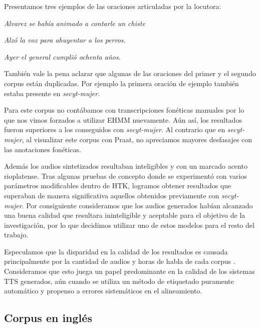 Presentamos tres ejemplos de las oraciones articuladas por la locutora:

\indent\indent \textit{Alvarez se había animado a contarle un chiste}

\indent\indent \textit{Alzó la voz para ahuyentar a los perros.}

\indent\indent \textit{Ayer el general cumplió ochenta años.}

También vale la pena aclarar que algunas de las oraciones del primer y el segundo corpus están duplicadas. Por ejemplo la primera oración de ejemplo también estaba presente en \textit{secyt-mujer}.

Para este corpus no contábamos con transcripciones fonéticas manuales por lo que nos vimos forzados a utilizar EHMM nuevamente. Aún así, los resultados fueron superiores a los conseguidos con \textit{secyt-mujer}. Al contrario que en \textit{secyt-mujer}, al visualizar este corpus con Praat, no apreciamos mayores desfasajes con las anotaciones fonéticas.

Además los audios sintetizados resultaban inteligibles y con un marcado acento rioplatense. Tras algunas pruebas de concepto donde se experimentó con varios parámetros modificables dentro de HTK, logramos obtener resultados que superaban de manera significativa aquellos obtenidos previamente con \textit{secyt-mujer}. Por consiguiente consideramos que los audios generados habían alcanzado una buena calidad que resultara ininteligible y aceptable para el objetivo de la investigación, por lo que decidimos utilizar uno de estos modelos para el resto del trabajo.


Especulamos que la disparidad en la calidad de los resultados es causada principalmente por la cantidad de audios y horas de habla de cada corpus \cite{whyItSucked}. Consideramos que esto juega un papel predominante en la calidad de los sistemas TTS generados, aún cuando se utiliza un método de etiquetado puramente automático y propenso a errores sistemáticos en el alineamiento.


\subsection{Corpus en inglés}

